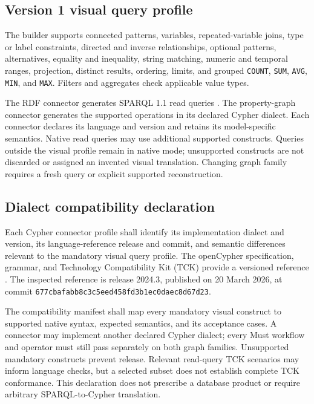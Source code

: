 \documentclass[11pt,a4paper]{article}
\begin{document}
\subsection{Version 1 visual query profile}\label{sec:profile}
The builder supports connected patterns, variables, repeated-variable joins, type or label constraints, directed and inverse relationships, optional patterns, alternatives, equality and inequality, string matching, numeric and temporal ranges, projection, distinct results, ordering, limits, and grouped \texttt{COUNT}, \texttt{SUM}, \texttt{AVG}, \texttt{MIN}, and \texttt{MAX}. Filters and aggregates check applicable value types.

The RDF connector generates SPARQL 1.1 read queries \citep{sparql}. The property-graph connector generates the supported operations in its declared Cypher dialect. Each connector declares its language and version and retains its model-specific semantics. Native read queries may use additional supported constructs. Queries outside the visual profile remain in native mode; unsupported constructs are not discarded or assigned an invented visual translation. Changing graph family requires a fresh query or explicit supported reconstruction.

\subsection{Dialect compatibility declaration}
Each Cypher connector profile shall identify its implementation dialect and version, its language-reference release and commit, and semantic differences relevant to the mandatory visual query profile. The openCypher specification, grammar, and Technology Compatibility Kit (TCK) provide a versioned reference \citep{opencypher}. The inspected reference is release 2024.3, published on 20 March 2026, at commit \texttt{677cbafabb8c3c5eed458fd3b1ec0daec8d67d23}.

The compatibility manifest shall map every mandatory visual construct to supported native syntax, expected semantics, and its acceptance cases. A connector may implement another declared Cypher dialect; every Must workflow and operator must still pass separately on both graph families. Unsupported mandatory constructs prevent release. Relevant read-query TCK scenarios may inform language checks, but a selected subset does not establish complete TCK conformance. This declaration does not prescribe a database product or require arbitrary SPARQL-to-Cypher translation.
\end{document}
